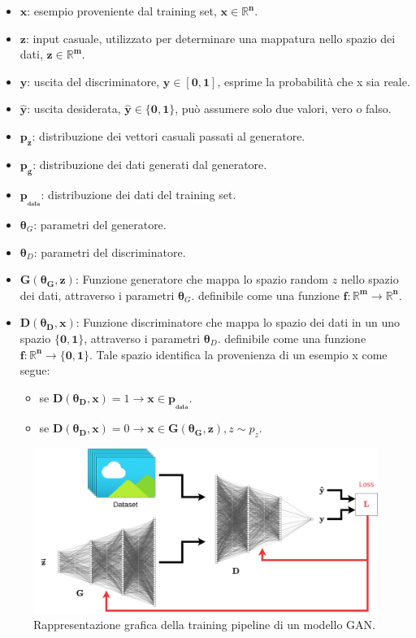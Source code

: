 \begin{itemize}
    \item $\mathbf{x}$: esempio proveniente dal training set, $\mathbf{x \in \mathbb{R}^n}$.
    \item $\mathbf{z}$: input casuale, utilizzato per determinare una mappatura nello spazio dei dati, $\mathbf{z \in \mathbb{R}^m}$.
    \item $\mathbf{y}$: uscita del discriminatore, $\mathbf{y \in [0,1]}$, esprime la probabilità che x sia reale.
    \item $\mathbf{\hat{y}}$: uscita desiderata, $\mathbf{\hat{y} \in \{0,1\}}$, può assumere solo due valori, vero o falso.
    \item $\mathbf{p_z}$: distribuzione dei vettori casuali passati al generatore.
    \item $\mathbf{p_g}$: distribuzione dei dati generati dal generatore.
    \item $\mathbf{p_{_{data}}}$: distribuzione dei dati del training set.
    \item $\mathbf{\theta}_G$: parametri del generatore.
    \item $\mathbf{\theta}_D$: parametri del discriminatore.
    \item $\mathbf{G(\theta_G, z)}$: Funzione generatore che mappa lo spazio random $z$ nello spazio dei dati, attraverso i parametri $\mathbf{\theta}_G$.
    definibile come una funzione $\mathbf{f: \mathbb{R}^m \rightarrow \mathbb{R}^n}$.
    \item $\mathbf{D(\theta_D, x)}$: Funzione discriminatore che mappa lo spazio dei dati in un uno spazio $\mathbf{\{0,1\}}$, attraverso i parametri $\mathbf{\theta}_D$. 
    definibile come una funzione $\mathbf{f:} \mathbf{\mathbb{R}^n \rightarrow \{0,1\}}$. Tale spazio identifica la provenienza di un esempio x come segue:
    \begin{itemize}
        \item se $\mathbf{D(\theta_D, x)} = 1 \rightarrow \mathbf{x} \in \mathbf{p_{_{data}}}$.
        \item se $\mathbf{D(\theta_D, x)} = 0 \rightarrow \mathbf{x} \in \mathbf{G(\theta_G, z)}, z \sim p_{z}$.
    \end{itemize}
\end{itemize}

    \begin{figure}[H]
        \centering
        \includegraphics[width=1.0\textwidth]{imgs/GAN_training.png}
        \caption{Rappresentazione grafica della training pipeline di un modello GAN.}
        \label{fig:gan_training}
    \end{figure}

